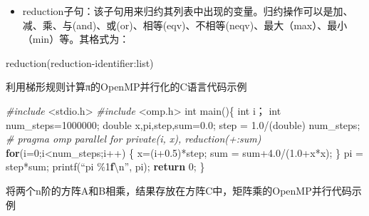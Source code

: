 \documentclass[]{ctexbook}
\newenvironment{Shaded}{\begin{snugshade}}{\end{snugshade}}
\newcommand{\ControlFlowTok}[1]{\textcolor[rgb]{0.13,0.29,0.53}{\textbf{#1}}}
\newcommand{\DataTypeTok}[1]{\textcolor[rgb]{0.13,0.29,0.53}{#1}}
\newcommand{\DecValTok}[1]{\textcolor[rgb]{0.00,0.00,0.81}{#1}}
\newcommand{\ErrorTok}[1]{\textcolor[rgb]{0.64,0.00,0.00}{\textbf{#1}}}
\newcommand{\FloatTok}[1]{\textcolor[rgb]{0.00,0.00,0.81}{#1}}
\newcommand{\ImportTok}[1]{#1}
\newcommand{\NormalTok}[1]{#1}
\newcommand{\PreprocessorTok}[1]{\textcolor[rgb]{0.56,0.35,0.01}{\textit{#1}}}
\providecommand{\tightlist}{%
  \setlength{\itemsep}{0pt}\setlength{\parskip}{0pt}}
\begin{document}
\begin{itemize}
\tightlist
\item
  reduction子句：该子句用来归约其列表中出现的变量。归约操作可以是加、减、乘、与(and)、或(or)、相等(eqv)、不相等(neqv)、最大（max）、最小（min）等。其格式为：
\end{itemize}

\begin{Shaded}
\begin{Highlighting}[]
\NormalTok{reduction(reduction{-}identifier:list)}
\end{Highlighting}
\end{Shaded}

利用梯形规则计算π的OpenMP并行化的C语言代码示例

\begin{Shaded}
\begin{Highlighting}[]
\PreprocessorTok{\#include }\ImportTok{\textless{}stdio.h\textgreater{}}
\PreprocessorTok{\#include }\ImportTok{\textless{}omp.h\textgreater{}}
\DataTypeTok{int}\NormalTok{ main()\{}
    \DataTypeTok{int}\NormalTok{ i；}
    \DataTypeTok{int}\NormalTok{ num\_steps=}\DecValTok{1000000}\NormalTok{;}
    \DataTypeTok{double}\NormalTok{ x,pi,step,sum=}\FloatTok{0.0}\NormalTok{;}
\NormalTok{    step = }\FloatTok{1.0}\NormalTok{/(}\DataTypeTok{double}\NormalTok{) num\_steps;}
    \PreprocessorTok{\# pragma omp parallel for private(i, x), reduction(+:sum)}
    \ControlFlowTok{for}\NormalTok{(i=}\DecValTok{0}\NormalTok{;i\textless{}num\_steps;i++)}
\NormalTok{    \{  }
\NormalTok{        x=(i+}\FloatTok{0.5}\NormalTok{)*step;}
\NormalTok{        sum = sum+}\FloatTok{4.0}\NormalTok{/(}\FloatTok{1.0}\NormalTok{+x*x);}
\NormalTok{    \}}
\NormalTok{    pi = step*sum;}
\NormalTok{    printf(“pi \%}\DecValTok{1}\ErrorTok{f}\NormalTok{\textbackslash{}n”, pi);}
    \ControlFlowTok{return} \DecValTok{0}\NormalTok{;}
\NormalTok{\}}
\end{Highlighting}
\end{Shaded}

将两个n阶的方阵A和B相乘，结果存放在方阵C中，矩阵乘的OpenMP并行代码示例
\end{document}

